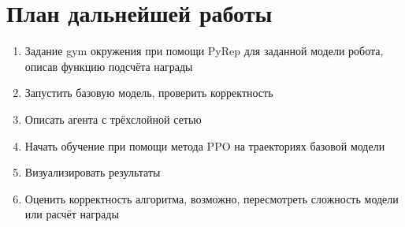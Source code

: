 \chapter{План дальнейшей работы}\label{ch:ch4}

\begin{enumerate}
    \item Задание gym окружения при помощи PyRep для заданной модели робота, описав функцию подсчёта награды
    \item Запустить базовую модель, проверить корректность 
    \item Описать агента с трёхслойной сетью
    \item Начать обучение при помощи метода PPO на траекториях базовой модели
    \item Визуализировать результаты
    \item Оценить корректность алгоритма, возможно, пересмотреть сложность модели или расчёт награды
\end{enumerate}

